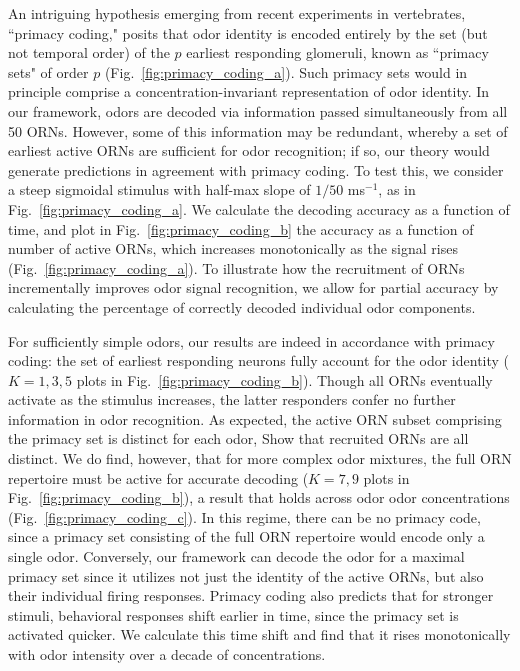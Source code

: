 An intriguing hypothesis emerging from recent experiments in vertebrates, ``primacy coding,"  posits that odor identity is encoded entirely by the set (but not temporal order) of the $p$ earliest responding glomeruli, known as ``primacy sets" of order $p$ (Fig.~\ref{fig:primacy_coding_a}). %
Such primacy sets would in principle comprise a concentration-invariant representation of odor identity. In our framework, odors are decoded via information passed simultaneously from all 50 ORNs. However, some of this information may be redundant, whereby a set of earliest active ORNs are sufficient for odor recognition; if so, our theory would generate predictions in agreement with primacy coding. To test this, we consider a steep sigmoidal stimulus with half-max slope of $1/50$ ms$^{-1}$, as in Fig.~\ref{fig:primacy_coding_a}. We calculate the decoding accuracy as a function of time, and plot in Fig.~\ref{fig:primacy_coding_b} the accuracy as a function of number of active ORNs, which increases monotonically as the signal rises (Fig.~\ref{fig:primacy_coding_a}). To illustrate how the recruitment of ORNs incrementally improves odor signal recognition, we allow for partial accuracy by calculating  the percentage of correctly decoded individual odor components.

For sufficiently simple odors, our results are indeed in accordance with primacy coding: the set of earliest responding neurons fully account for the odor identity ($K=1, 3, 5$ plots in Fig.~\ref{fig:primacy_coding_b}). Though all ORNs eventually activate as the stimulus increases, the latter responders confer no further information in odor recognition. As expected, the active ORN subset comprising the primacy set is distinct for each odor,   {\color{blue} Show that recruited ORNs are all distinct}. We do find, however, that for more complex odor mixtures, the full ORN repertoire must be active for  accurate decoding ($K=7, 9$ plots in Fig.~\ref{fig:primacy_coding_b}), a result that holds across odor  odor concentrations (Fig.~\ref{fig:primacy_coding_c}). In this regime, there can  be no primacy code, since a primacy set consisting of the full ORN repertoire would encode only a single odor. Conversely, our framework can decode the odor for a maximal primacy set since it utilizes not just the identity of the active ORNs, but also their individual firing responses. Primacy coding also predicts that for stronger stimuli, behavioral responses shift earlier in time, since the primacy set is activated quicker. We calculate this time shift and find that it rises monotonically with odor intensity over a decade of concentrations.  %

